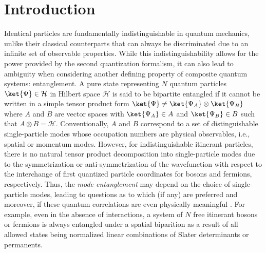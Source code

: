 \section{Introduction}
Identical particles are fundamentally indistinguishable in quantum mechanics,
unlike their classical counterparts that can always be discriminated due to an
infinite set of observable properties. While this indistinguishability allows
for the power provided by the second quantization formalism, it can also lead to
ambiguity \cite{Zanardi:2001ec,Shi:2003jj,Shi:2004fw} when considering another
defining property of composite quantum systems: entanglement.  A pure state
representing $N$ quantum particles $\ket{\Psi} \in \mathcal{H}$ in Hilbert
space $\mathcal{H}$ is said to be bipartite entangled if it cannot be written
in a simple tensor product form $\ket{\Psi} \ne \ket{\Psi_{A}} \otimes
\ket{\Psi_{B}}$ where $A$ and $B$ are vector spaces with
$\ket{\Psi_{A}} \in A$ and $\ket{\Psi_B} \in B$ such that $A
\otimes B = \mathcal{H}$.  Conventionally, $A$ and 
$B$ correspond to a set of distinguishable single-particle modes whose
occupation numbers are physical observables, i.e.,  spatial or momentum modes.
However, for indistinguishable itinerant particles, there is no natural tensor
product decomposition into single-particle modes due to the
symmetrization or anti-symmetrization of the wavefunction with respect to the
interchange of first quantized particle coordinates for bosons and fermions,
respectively.  Thus, the \emph{mode entanglement}
may depend on the choice of single-particle modes, leading to questions as to which
(if any) are preferred and moreover, if these quantum correlations are
even physically meaningful \cite{Ghirardi:2004dl, Barnum:2004bm,
Dunningham:2005fu,Wiseman:2003vn, Wiseman:2003jx,
Benatti:2012cy,Balachandran:2013en, Dalton:2017qe}. For example, even in the absence of
interactions, a system of $N$ free itinerant bosons
\cite{Simon:2002it,Ding:2009gq} or fermions
\cite{Schliemann:2001ea,Zanardi:2002jw,Zanardi:2002gs} is always entangled
under a spatial biparition as a result of all allowed states being normalized
linear combinations of Slater determinants or permanents.  

